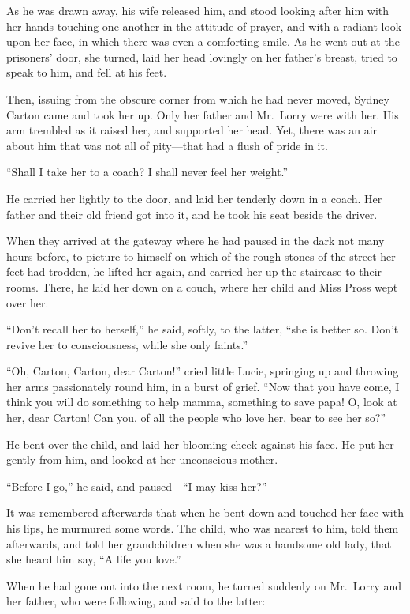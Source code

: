 As he was drawn away, his wife released him, and stood looking after
him with her hands touching one another in the attitude of prayer,
and with a radiant look upon her face, in which there was even a
comforting smile.  As he went out at the prisoners' door, she turned,
laid her head lovingly on her father's breast, tried to speak to him,
and fell at his feet.

Then, issuing from the obscure corner from which he had never moved,
Sydney Carton came and took her up.  Only her father and Mr.\ Lorry
were with her.  His arm trembled as it raised her, and supported her head.
Yet, there was an air about him that was not all of pity---that had a flush
of pride in it.

``Shall I take her to a coach?  I shall never feel her weight.''

He carried her lightly to the door, and laid her tenderly down in a
coach.  Her father and their old friend got into it, and he took his
seat beside the driver.

When they arrived at the gateway where he had paused in the dark not
many hours before, to picture to himself on which of the rough stones
of the street her feet had trodden, he lifted her again, and carried
her up the staircase to their rooms.  There, he laid her down on a
couch, where her child and Miss Pross wept over her.

``Don't recall her to herself,'' he said, softly, to the latter, ``she is
better so.  Don't revive her to consciousness, while she only faints.''

``Oh, Carton, Carton, dear Carton!'' cried little Lucie, springing up
and throwing her arms passionately round him, in a burst of grief.
``Now that you have come, I think you will do something to help mamma,
something to save papa!  O, look at her, dear Carton!  Can you, of all
the people who love her, bear to see her so?''

He bent over the child, and laid her blooming cheek against his face.
He put her gently from him, and looked at her unconscious mother.

``Before I go,'' he said, and paused---``I may kiss her?''

It was remembered afterwards that when he bent down and touched her
face with his lips, he murmured some words.  The child, who was
nearest to him, told them afterwards, and told her grandchildren when
she was a handsome old lady, that she heard him say, ``A life you love.''

When he had gone out into the next room, he turned suddenly on
Mr.\ Lorry and her father, who were following, and said to the latter:

